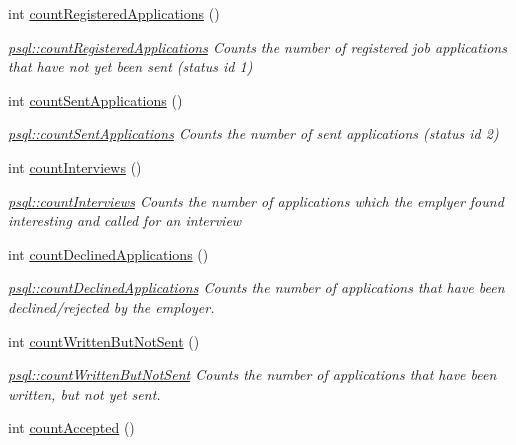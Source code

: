 \begin{DoxyCompactItemize}
int \mbox{\hyperlink{classpsql_ac6bb08051a489a4c36cad8bb7f1abd1c}{count\+Registered\+Applications}} ()
\begin{DoxyCompactList}\small\item\em \mbox{\hyperlink{classpsql_ac6bb08051a489a4c36cad8bb7f1abd1c}{psql\+::count\+Registered\+Applications}} Counts the number of registered job applications that have not yet been sent (status id 1) \end{DoxyCompactList}\item 
int \mbox{\hyperlink{classpsql_a1aa2281c867a8a2916963ec9391c2320}{count\+Sent\+Applications}} ()
\begin{DoxyCompactList}\small\item\em \mbox{\hyperlink{classpsql_a1aa2281c867a8a2916963ec9391c2320}{psql\+::count\+Sent\+Applications}} Counts the number of sent applications (status id 2) \end{DoxyCompactList}\item 
int \mbox{\hyperlink{classpsql_a5d382c01e6d7957e628ade338ddaf70b}{count\+Interviews}} ()
\begin{DoxyCompactList}\small\item\em \mbox{\hyperlink{classpsql_a5d382c01e6d7957e628ade338ddaf70b}{psql\+::count\+Interviews}} Counts the number of applications which the emplyer found interesting and called for an interview \end{DoxyCompactList}\item 
int \mbox{\hyperlink{classpsql_accf6323167fbe0c622b3c14a6e454195}{count\+Declined\+Applications}} ()
\begin{DoxyCompactList}\small\item\em \mbox{\hyperlink{classpsql_accf6323167fbe0c622b3c14a6e454195}{psql\+::count\+Declined\+Applications}} Counts the number of applications that have been declined/rejected by the employer. \end{DoxyCompactList}\item 
int \mbox{\hyperlink{classpsql_a0d16f7ff59525da8743b10cb5ca29636}{count\+Written\+But\+Not\+Sent}} ()
\begin{DoxyCompactList}\small\item\em \mbox{\hyperlink{classpsql_a0d16f7ff59525da8743b10cb5ca29636}{psql\+::count\+Written\+But\+Not\+Sent}} Counts the number of applications that have been written, but not yet sent. \end{DoxyCompactList}\item 
int \mbox{\hyperlink{classpsql_abc598b3a1783194380b9ab22d9341357}{count\+Accepted}} ()

\end{DoxyCompactItemize}
